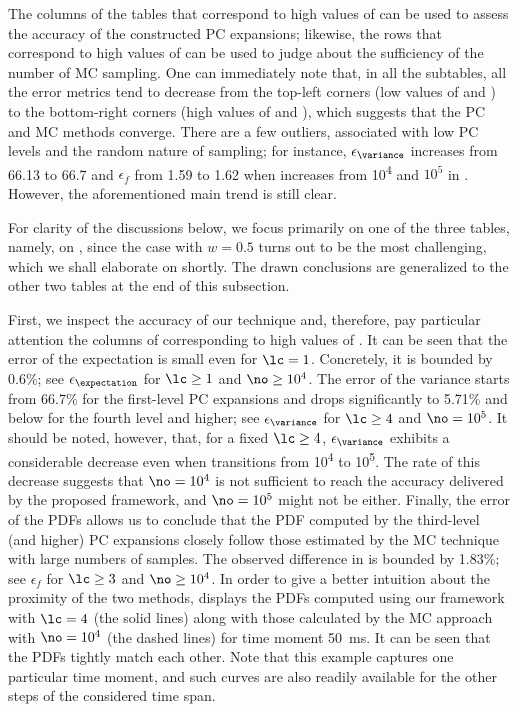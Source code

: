 The columns of the tables that correspond to high values of \no can be used to
assess the accuracy of the constructed \ac{PC} expansions; likewise, the rows
that correspond to high values of \lc can be used to judge about the
sufficiency of the number of \ac{MC} sampling. One can immediately note that,
in all the subtables, all the error metrics tend to decrease from the top-left
corners (low values of \lc and \ns) to the bottom-right corners (high values of
\lc and \ns), which suggests that the \ac{PC} and \ac{MC} methods converge.
There are a few outliers, associated with low \ac{PC} levels and the random
nature of sampling; for instance, $\epsilon_{\variance}$ increases from 66.13 to
66.7 and $\epsilon_f$ from 1.59 to 1.62 when \no increases from
10\textsuperscript{4} and $10^5$ in . However, the
aforementioned main trend is still clear.

For clarity of the discussions below, we focus primarily on one of the three
tables, namely, on , since the case with $w = 0.5$
turns out to be the most challenging, which we shall elaborate on shortly. The
drawn conclusions are generalized to the other two tables at the end of this
subsection.

First, we inspect the accuracy of our technique and, therefore, pay particular
attention the columns of  corresponding to high values
of \no. It can be seen that the error of the expectation is small even for $\lc
= 1$. Concretely, it is bounded by 0.6\%; see $\epsilon_{\expectation}$ for
$\lc \geq 1$ and $\no \geq 10^4$. The error of the variance starts from 66.7\%
for the first-level \ac{PC} expansions and drops significantly to 5.71\% and
below for the fourth level and higher; see $\epsilon_{\variance}$ for $\lc \geq
4$ and $\no = 10^5$. It should be noted, however, that, for a fixed $\lc \geq
4$, $\epsilon_{\variance}$ exhibits a considerable decrease even when \no
transitions from 10\textsuperscript{4} to 10\textsuperscript{5}. The rate of
this decrease suggests that $\no = 10^4$ is not sufficient to reach the accuracy
delivered by the proposed framework, and $\no = 10^5$ might not be either.
Finally, the error of the \acp{PDF} allows us to conclude that the \ac{PDF}
computed by the third-level (and higher) \ac{PC} expansions closely follow those
estimated by the \ac{MC} technique with large numbers of samples. The observed
difference in  is bounded by 1.83\%; see $\epsilon_f$
for $\lc \geq 3$ and $\no \geq 10^4$. In order to give a better intuition about
the proximity of the two methods,  displays the
\acp{PDF} computed using our framework with $\lc = 4$ (the solid lines) along
with those calculated by the \ac{MC} approach with $\no = 10^4$ (the dashed
lines) for time moment 50~ms. It can be seen that the \acp{PDF} tightly match
each other. Note that this example captures one particular time moment, and such
curves are also readily available for the other steps of the considered time
span.

